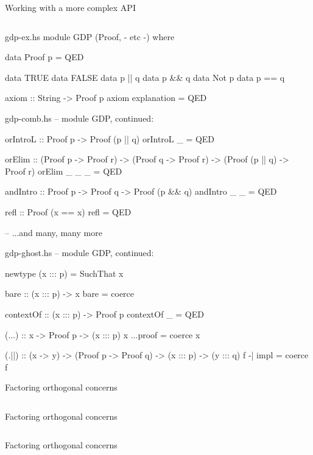 \documentclass{beamer}
\begin{document}
\begin{frame}{Working with a more complex API}
\inputminted{haskell}{containers.hs}
\end{frame}

\begin{filecontents*}{gdp-ex.hs}
module GDP (Proof, {- etc -}) where

data Proof p = QED

data TRUE
data FALSE
data p || q
data p && q
data Not p
data p == q

axiom :: String -> Proof p
axiom explanation = QED
\end{filecontents*}
\begin{filecontents*}{gdp-comb.hs}
-- module GDP, continued:

orIntroL :: Proof p -> Proof (p || q)
orIntroL _ = QED

orElim :: (Proof p        -> Proof r)
       -> (Proof q        -> Proof r)
       -> (Proof (p || q) -> Proof r)
orElim _ _ _ = QED
       
andIntro :: Proof p -> Proof q -> Proof (p && q)
andIntro _ _ = QED

refl :: Proof (x == x)
refl = QED

-- ...and many, many more
\end{filecontents*}

\begin{filecontents*}{gdp-ghost.hs}
-- module GDP, continued:
  
newtype (x ::: p) = SuchThat x

bare :: (x ::: p) -> x
bare = coerce

contextOf :: (x ::: p) -> Proof p
contextOf _ = QED

(...) :: x -> Proof p -> (x ::: p)
x ...proof = coerce x

(.||) :: (x -> y) -> (Proof p -> Proof q) -> (x ::: p) -> (y ::: q)
f -| impl = coerce f

\end{filecontents*}

\begin{frame}{Factoring orthogonal concerns}
\inputminted{haskell}{gdp-ex.hs}
\end{frame}

\begin{frame}{Factoring orthogonal concerns}
\inputminted{haskell}{gdp-comb.hs}
\end{frame}

\begin{frame}{Factoring orthogonal concerns}
\inputminted{haskell}{gdp-ghost.hs}
\end{frame}
\end{document}
